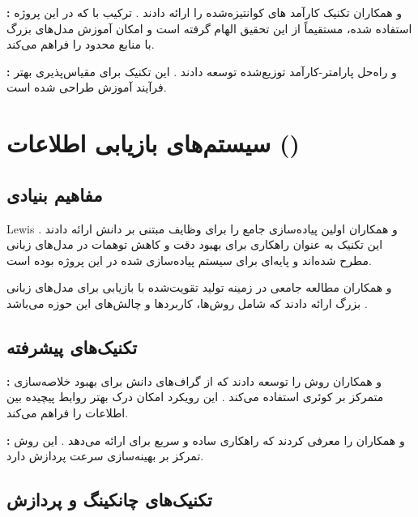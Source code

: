 \documentclass[11pt, a4paper, oneside]{book}
\begin{document}
	\textbf{:}  و همکاران تکنیک  کارآمد ‌های کوانتیزه‌شده را ارائه دادند \cite{dettmers_qlora_2023}. ترکیب  با  که در این پروژه استفاده شده، مستقیماً از این تحقیق الهام گرفته است و امکان آموزش مدل‌های بزرگ با منابع محدود را فراهم می‌کند.

	\textbf{:}  و  راه‌حل  پارامتر-کارآمد توزیع‌شده توسعه دادند \cite{gao_dlora_2024}. این تکنیک برای مقیاس‌پذیری بهتر فرآیند آموزش طراحی شده است.

	\section{سیستم‌های بازیابی اطلاعات ()}

	\subsection{مفاهیم بنیادی }

	Lewis و همکاران اولین پیاده‌سازی جامع  را برای وظایف  مبتنی بر دانش ارائه دادند \cite{lewis_retrieval-augmented_2021}. این تکنیک به عنوان راهکاری برای بهبود دقت و کاهش توهمات در مدل‌های زبانی مطرح شده‌اند و پایه‌ای برای سیستم  پیاده‌سازی شده در این پروژه بوده است.

	 و همکاران مطالعه جامعی در زمینه تولید تقویت‌شده با بازیابی برای مدل‌های زبانی بزرگ ارائه دادند که شامل روش‌ها، کاربردها و چالش‌های این حوزه می‌باشد \cite{gao_retrieval-augmented_2024}.

	\subsection{تکنیک‌های پیشرفته }

	\textbf{:}  و همکاران روش  را توسعه دادند که از گراف‌های دانش برای بهبود خلاصه‌سازی متمرکز بر کوئری استفاده می‌کند \cite{edge_local_2024}. این رویکرد امکان درک بهتر روابط پیچیده بین اطلاعات را فراهم می‌کند.

	\textbf{:}  و همکاران  را معرفی کردند که راهکاری ساده و سریع برای  ارائه می‌دهد \cite{guo_lightrag_2024}. این روش تمرکز بر بهینه‌سازی سرعت پردازش دارد.

	\subsection{تکنیک‌های چانکینگ و پردازش}
\end{document}
